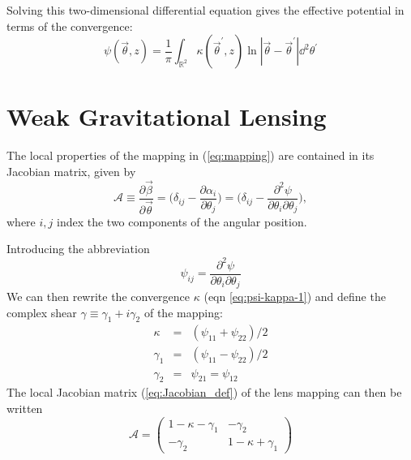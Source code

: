 Solving this two-dimensional differential equation gives the effective potential in terms of the convergence:
\begin{equation}
  \label{eq:psi-kappa}
  \psi(\vec{\theta},z) 
  = \frac{1}{\pi}\int_{\mathbb{R}^2} \kappa(\vec{\theta}^\prime,z) 
  \ln|\vec{\theta} - \vec{\theta}^\prime|\dd^2\theta^\prime
\end{equation}

\section{Weak Gravitational Lensing}

The local properties of the mapping in (\ref{eq:mapping}) are contained in its Jacobian matrix, given by
\begin{equation}
  \label{eq:Jacobian_def}
  \mathcal{A} \equiv \frac{\partial \vec{\beta}}{\partial \vec{\theta}} = \Big(\delta_{ij} - \frac{\partial \alpha_i}{\partial \theta_j} \Big) = \Big(\delta_{ij} - \frac{\partial^2 \psi}{\partial \theta_i \partial \theta_j} \Big),
\end{equation}
where $i,j$ index the two components of the angular position.

Introducing the abbreviation
\begin{equation}
  \label{eq:psi_ij}
  \psi_{ij} = \frac{\partial^2 \psi}{\partial \theta_i \partial \theta_j}
\end{equation}
We can then rewrite the convergence $\kappa$ (eqn \ref{eq:psi-kappa-1}) and define the complex shear $\gamma \equiv \gamma_1 + i\gamma_2$ of the mapping:
\begin{equation}
  \label{eq:gamma-def}
  \begin{array}{lcl}
    \kappa & = & (\psi_{11} + \psi_{22})/2\\
    \gamma_1 & = & (\psi_{11} - \psi_{22})/2\\
    \gamma_2 & = & \psi_{21} = \psi_{12}
  \end{array}
\end{equation}
The local Jacobian matrix (\ref{eq:Jacobian_def}) of the lens mapping can then be written
\begin{equation}
  \mathcal{A} = \left(
  \begin{array}{cc}
    1 - \kappa - \gamma_1 & -\gamma_2\\
    -\gamma_2             & 1-\kappa+\gamma_1
  \end{array}\right)
\end{equation}

